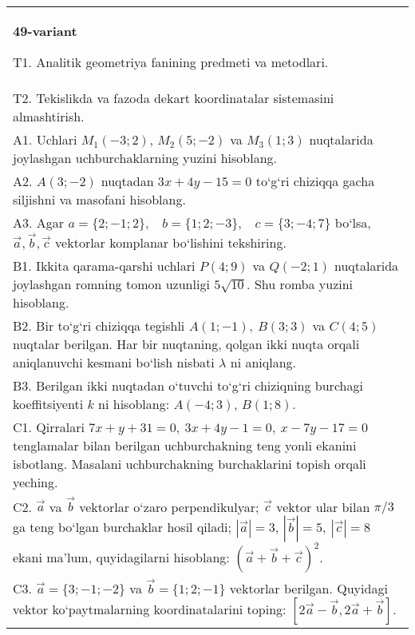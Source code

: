 \documentclass{article}
\begin{document}
\begin{tabular}{m{17cm}}
\textbf{49-variant}

T1. Analitik geometriya fanining predmeti va metodlari.
 \\
T2. 
Tekislikda va fazoda dekart koordinatalar sistemasini almashtirish.
 \\
A1. 
Uchlari $M_1 (-3;2) $, $M_2 (5;-2) $ va $M_3 (1;3) $
nuqtalarida joylashgan uchburchaklarning yuzini hisoblang.
 \\
A2. 
$A (3;-2) $ nuqtadan $3x+4y-15=0$ to‘g‘ri chiziqqa
gacha siljishni va masofani hisoblang.
 \\
A3. 
Agar \(a = \{ 2; - 1;2\}, \ \ \ \ b = \{ 1;2; - 3\}, \ \ \ \ c = \{ 3; - 4;7\}\) bo‘lsa, $\overrightarrow{a}, \overrightarrow{b}, \overrightarrow{c}$ vektorlar komplanar bo‘lishini tekshiring.
 \\
B1. 
Ikkita qarama-qarshi uchlari \(P (4;9) \) va \(Q (-2; 1) \) nuqtalarida joylashgan romning tomon uzunligi \(5\sqrt{10}\). Shu
romba yuzini hisoblang.
 \\
B2. 
Bir to‘g‘ri chiziqqa tegishli \(A (1;-1),\ B (3;3) \) va
\(C (4;5) \) nuqtalar berilgan. Har bir nuqtaning, qolgan ikki nuqta orqali aniqlanuvchi kesmani bo‘lish nisbati $\lambda$ ni aniqlang.
 \\
B3. 
Berilgan ikki nuqtadan o‘tuvchi to‘g‘ri chiziqning burchagi
koeffitsiyenti $k$ ni hisoblang: $A (-4;3) $, $B (1;8) $.
 \\
C1. 
Qirralari
\(7x+y+31=0,\ 3x+4y-1=0,\ x-7y-17=0\) tenglamalar
bilan berilgan uchburchakning teng yonli ekanini isbotlang.
Masalani uchburchakning
burchaklarini topish orqali yeching.
 \\
C2. 
$\vec{a}$ va $\vec{b}$ vektorlar o‘zaro perpendikulyar; $\vec{c}$ vektor ular bilan $\pi/3$ ga teng bo‘lgan burchaklar hosil qiladi; $|\vec{a}| = 3$, $|\vec{b}| = 5,\ |\vec{c}| = 8$ ekani ma’lum, quyidagilarni hisoblang:
$ (\vec{a} + \vec{b} + \vec{c}) ^{2}$.
 \\
C3. 
$\vec{a} = \{ 3; - 1; - 2\}$ va $\vec{b} = \{ 1;2; - 1\}$ vektorlar berilgan. Quyidagi vektor ko‘paytmalarning koordinatalarini toping:
$\left\lbrack 2\vec{a} - \vec{b},2\vec{a} + \vec{b} \right\rbrack$.
 \\

\end{tabular}
\vspace{1cm}
\end{document}

